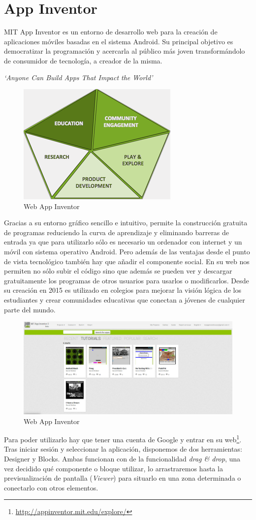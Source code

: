 \documentclass[a4paper, 12pt]{book}
\begin{document}
\section{App Inventor} 
\label{sec:seccion1}
MIT App Inventor es un entorno de desarrollo web para la creación de aplicaciones móviles basadas en el sistema Android. Su principal objetivo es democratizar la programación y acercarla al público más joven transformándolo de consumidor de tecnología, a creador de la misma.
\begin{center}
        \textit{`Anyone Can Build Apps That Impact the World'}
\end{center}
\begin{figure}[H]
  \centering
  \includegraphics[width=0.40\linewidth, keepaspectratio]{img/usesview}
  \caption{Web App Inventor}
  \label{fig:appinventorgallery}
\end{figure}
Gracias a su entorno gráfico sencillo e intuitivo, permite la construcción gratuita de programas reduciendo la curva de aprendizaje y eliminando barreras de entrada ya que para utilizarlo sólo es necesario un ordenador con internet y un móvil con sistema operativo Android. Pero además de las ventajas desde el punto de vista tecnológico también hay que añadir el componente social. En su web nos permiten no sólo subir el código sino que además se pueden ver y descargar gratuitamente los programas de otros usuarios para usarlos o modificarlos. Desde su creación en 2015 es utilizado en colegios para mejorar la visión lógica de los estudiantes y crear comunidades educativas que conectan a jóvenes de cualquier parte del mundo. 
\begin{figure}[H]
  \centering
  \includegraphics[width=0.90\linewidth, keepaspectratio]{img/appinventorgallery}
  \caption{Web App Inventor}
  \label{fig:appinventorgallery}
\end{figure} 
Para poder utilizarlo hay que tener una cuenta de Google y entrar en su web\footnote{\url{http://appinventor.mit.edu/explore/}}. Tras iniciar sesión y seleccionar la aplicación, disponemos de dos herramientas: Designer y Blocks. Ambas funcionan con de la funcionalidad \textit{drag \& drop}, una vez decidido qué componente o bloque utilizar, lo arrastraremos hasta la previsualización de pantalla (\textit{Viewer}) para situarlo en una zona determinada o conectarlo con otros elementos.
\end{document}
